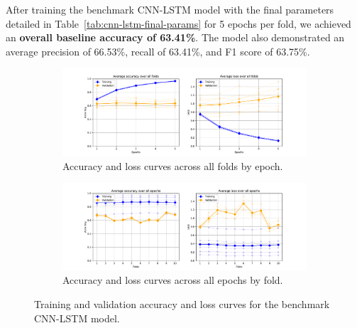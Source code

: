 After training the benchmark CNN-LSTM model with the final parameters detailed in Table~\ref{tab:cnn-lstm-final-params} for 5 epochs per fold, we achieved an \textbf{overall baseline accuracy of 63.41\%}. The model also demonstrated an average precision of 66.53\%, recall of 63.41\%, and F1 score of 63.75\%.

\begin{figure}[htbp]
    \centering
    \begin{subfigure}[htbp]{\textwidth}
        \centering
        \includegraphics[trim={3cm 0 3cm 0.8cm},clip,width=\textwidth]{img/ch3/baseline_results/cnn_lstm_by_epoch.pdf}
        \caption{Accuracy and loss curves across all folds by epoch.}
        \label{fig:baseline-by-epoch}
    \end{subfigure}
    
    \vspace{0.5cm}
    
    \begin{subfigure}[htbp]{\textwidth}
        \centering
        \includegraphics[trim={3cm 0 3cm 0.8cm},clip,width=\textwidth]{img/ch3/baseline_results/cnn_lstm_by_fold.pdf}
        \caption{Accuracy and loss curves across all epochs by fold.}
        \label{fig:baseline-by-fold}
    \end{subfigure}
    \caption{Training and validation accuracy and loss curves for the benchmark CNN-LSTM model.}
    \label{fig:baseline-acc-loss}
\end{figure}

